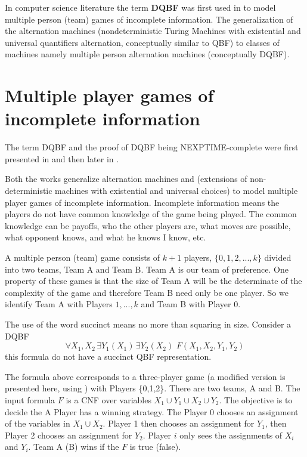 \documentclass[runningheads]{llncs}
\begin{document}
In computer science literature the term \textbf{DQBF} was first used in \cite{peterson1979multiple} to model multiple person (team) games of incomplete information.
The generalization of the alternation machines (nondeterministic Turing Machines with existential and universal quantifiers alternation, conceptually similar to QBF) to classes of machines namely multiple person alternation machines (conceptually DQBF).

\section{Multiple player games of incomplete information \cite{petersonr79, peterson2001lower}}

The term DQBF and the proof of DQBF being NEXPTIME-complete were first presented in \cite{peterson1979multiple} and then later in \cite{peterson2001lower}.

Both the works generalize alternation machines \cite{chandra1981lj} and \cite{fraenkel78} (extensions of non-deterministic machines with existential and universal choices) to model multiple player games of incomplete information.
Incomplete information means the players do not have common knowledge of the game being played.
The common knowledge can be payoffs, who the other players are, what moves are possible, what opponent knows, and what he knows I know, etc.

A multiple person (team) game consists of $k+1$ players, $\{0, 1,2, ... ,k\}$ divided into two teams, Team A and Team B.
Team A is our team of preference.
One property of these games is that the size of Team A will be the determinate of the complexity of the game and therefore Team B need only be one player.
So we identify Team A with Players $1,...,k$ and Team B with Player 0.

The use of the word succinct means no more than squaring in size. Consider a DQBF
\[
\forall X_1,X_2 \, \exists Y_1(X_1) \, \exists Y_2(X_2) \,\, F (X_1, X_2, Y_1, Y_2)
\]
this formula do not have a succinct QBF representation.

The formula above corresponds to a three-player game (a modified version is presented here, using \cite{hearn06}) with Players \{0,1,2\}.
There are two teams, A and B.
The input formula $F$ is a CNF over variables $X_1 \cup Y_1 \cup X_2 \cup Y_2$.
The objective is to decide the A Player has a winning strategy.
The Player 0 chooses an assignment of the variables in $X_1 \cup X_2$.
Player 1 then chooses an assignment for $Y_1$, then Player 2 chooses an assignment for $Y_2$.
Player $i$ only sees the assignments of $X_i$ and $Y_i$. Team A (B) wins if the $F$ is true (false).
\end{document}
